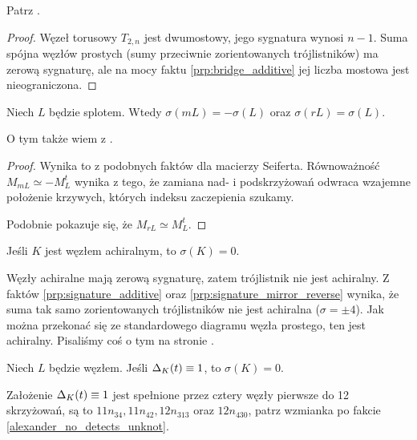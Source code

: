 Patrz \cite[s. 145]{livingston93}.

\begin{proof}
    Węzeł torusowy $T_{2,n}$ jest dwumostowy, jego sygnatura wynosi $n - 1$.
    Suma spójna węzłów prostych (sumy przeciwnie zorientowanych trójlistników) ma zerową sygnaturę, ale na mocy faktu \ref{prp:bridge_additive} jej liczba mostowa jest nieograniczona.
\end{proof}

\begin{proposition}
%
%
\label{prp:signature_mirror_reverse}%
    Niech $L$ będzie splotem.
    Wtedy $\sigma(mL) = -\sigma(L)$ oraz $\sigma(rL) = \sigma(L)$.
\end{proposition}

O tym także wiem z \cite[s. 127]{murasugi96}.

\begin{proof}
    Wynika to z podobnych faktów dla macierzy Seiferta.
    Równoważność $M_{mL} \simeq - M_L^t$ wynika z tego, że zamiana nad- i podskrzyżowań odwraca wzajemne położenie krzywych, których indeksu zaczepienia szukamy.

    Podobnie pokazuje się, że $M_{rL} \simeq M_L^t$.
\end{proof}

\begin{corollary}
%
\label{cor:acheiral_signature}%
    Jeśli $K$ jest węzłem achiralnym, to $\sigma(K) = 0$.
\end{corollary}

Węzły achiralne mają zerową sygnaturę, zatem trójlistnik nie jest achiralny.
Z faktów \ref{prp:signature_additive} oraz \ref{prp:signature_mirror_reverse} wynika, że suma tak samo zorientowanych trójlistników nie jest achiralna ($\sigma = \pm 4$).
Jak można przekonać się ze standardowego diagramu węzła prostego, ten jest achiralny.
Pisaliśmy coś o tym na stronie \pageref{two_sums_of_two_trefoils}.

\begin{proposition}
\label{trivial_alexander_polynomial}%
%
    Niech $L$ będzie węzłem.
    Jeśli $\Delta_K(t) \equiv 1$, to $\sigma (K) = 0$.
\end{proposition}

Założenie $\Delta_K(t) \equiv 1$ jest spełnione przez cztery węzły pierwsze do 12 skrzyżowań, są to $11n_{34}, 11n_{42}, 12n_{313}$ oraz $12n_{430}$, patrz wzmianka po fakcie \ref{alexander_no_detects_unknot}.

